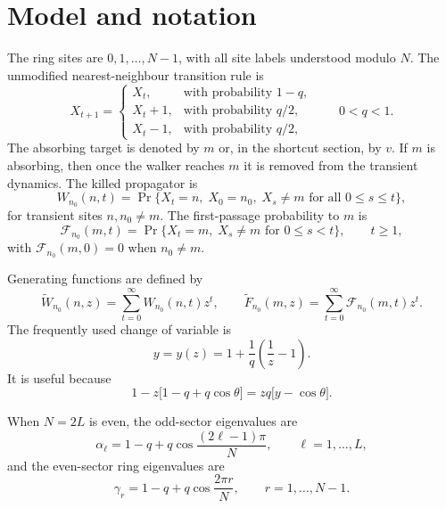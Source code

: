 \documentclass[11pt]{article}
\newcommand{\wt}{\widetilde}
\begin{document}
\section{Model and notation}
\label{sec:model}

The ring sites are $0,1,\ldots,N-1$, with all site labels understood modulo $N$.  The unmodified
nearest-neighbour transition rule is
\begin{equation}
  X_{t+1}=\begin{cases}
  X_t, & \text{with probability }1-q,\\
  X_t+1, & \text{with probability }q/2,\\
  X_t-1, & \text{with probability }q/2,
  \end{cases}
  \qquad 0<q<1.
\end{equation}
The absorbing target is denoted by $m$ or, in the shortcut section, by $v$.  If $m$ is absorbing,
then once the walker reaches $m$ it is removed from the transient dynamics.  The killed propagator
is
\begin{equation}
  W_{n_0}(n,t)=\Pr\{X_t=n,\; X_0=n_0,\; X_s\neq m\text{ for all }0\leq s\leq t\},
\end{equation}
for transient sites $n,n_0\neq m$.  The first-passage probability to $m$ is
\begin{equation}
  \mathcal F_{n_0}(m,t)=\Pr\{X_t=m,\; X_s\neq m\text{ for }0\leq s<t\},
  \qquad t\geq 1,
\end{equation}
with $\mathcal F_{n_0}(m,0)=0$ when $n_0\neq m$.

Generating functions are defined by
\begin{equation}
  \wt W_{n_0}(n,z)=\sum_{t=0}^{\infty}W_{n_0}(n,t)z^t,
  \qquad
  \wt F_{n_0}(m,z)=\sum_{t=0}^{\infty}\mathcal F_{n_0}(m,t)z^t.
\end{equation}
The frequently used change of variable is
\begin{equation}
  \boxed{y=y(z)=1+\frac1q\left(\frac1z-1\right).}
  \label{eq:y-definition}
\end{equation}
It is useful because
\begin{equation}
  1-z\bigl[1-q+q\cos\theta\bigr]
  =zq\bigl[y-\cos\theta\bigr].
  \label{eq:denominator-y}
\end{equation}

When $N=2L$ is even, the odd-sector eigenvalues are
\begin{equation}
  \boxed{\alpha_\ell=1-q+q\cos\frac{(2\ell-1)\pi}{N},
  \qquad \ell=1,\ldots,L,}
  \label{eq:alpha-definition}
\end{equation}
and the even-sector ring eigenvalues are
\begin{equation}
  \boxed{\gamma_r=1-q+q\cos\frac{2\pi r}{N},
  \qquad r=1,\ldots,N-1.}
  \label{eq:gamma-definition}
\end{equation}
\end{document}

